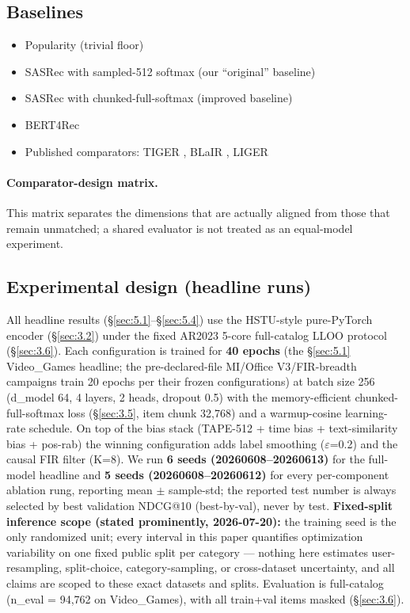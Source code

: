 \subsection{Baselines}\label{sec:4.2}

\begin{itemize}
\tightlist
\item
  Popularity (trivial floor)
\item
  SASRec with sampled-512 softmax (our ``original'' baseline)
\item
  SASRec with chunked-full-softmax (improved baseline)
\item
  BERT4Rec \citep{sun2019bert4rec}
\item
  Published comparators: TIGER \citep{rajput2023tiger}, BLaIR \citep{hou2024blair}, LIGER \citep{yang2024liger}
\end{itemize}

\paragraph{Comparator-design matrix.}
This matrix separates the dimensions that are actually aligned from those that remain
unmatched; a shared evaluator is not treated as an equal-model experiment.




\subsection{Experimental design (headline runs)}\label{sec:4.3}

All headline results (\S\ref{sec:5.1}--\S\ref{sec:5.4}) use the HSTU-style pure-PyTorch encoder (\S\ref{sec:3.2}) under the fixed AR2023 5-core full-catalog LLOO protocol (\S\ref{sec:3.6}). Each configuration is trained for \textbf{40 epochs} (the \S\ref{sec:5.1} Video\_Games headline; the pre-declared-file MI/Office V3/FIR-breadth campaigns train 20 epochs per their frozen configurations) at batch size 256 (d\_model 64, 4 layers, 2 heads, dropout 0.5) with the memory-efficient chunked-full-softmax loss (\S\ref{sec:3.5}, item chunk 32,768) and a warmup-cosine learning-rate schedule. On top of the bias stack (TAPE-512 + time bias + text-similarity bias + pos-rab) the winning configuration adds label smoothing (\ensuremath{\varepsilon}=0.2) and the causal FIR filter (K=8). We run \textbf{6 seeds (20260608--20260613)} for the full-model headline and \textbf{5 seeds (20260608--20260612)} for every per-component ablation rung, reporting mean \ensuremath{\pm} sample-std; the reported test number is always selected by best validation NDCG@10 (best-by-val), never by test. \textbf{Fixed-split inference scope (stated prominently, 2026-07-20):} the training seed is the only randomized unit; every interval in this paper quantifies optimization variability on one fixed public split per category --- nothing here estimates user-resampling, split-choice, category-sampling, or cross-dataset uncertainty, and all claims are scoped to these exact datasets and splits. Evaluation is full-catalog (n\_eval = 94,762 on Video\_Games), with all train+val items masked (\S\ref{sec:3.6}).

